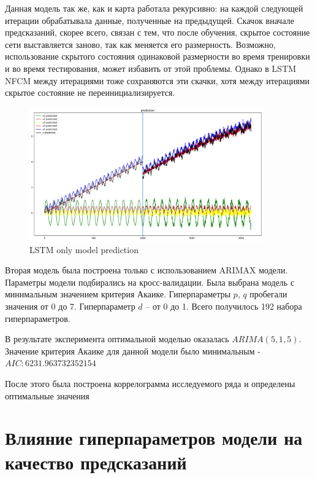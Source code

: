 Данная модель так же, как и карта работала рекурсивно:
на каждой следующей итерации обрабатывала данные, полученные на предыдущей.
Скачок вначале предсказаний, скорее всего, связан с тем, что после обучения,
скрытое состояние сети выставляется заново, так как меняется его размерность.
Возможно, использование скрытого состояния одинаковой размерности во время
тренировки и во время тестирования, может избавить от этой проблемы. Однако
в LSTM NFCM между итерациями тоже сохраняются эти скачки, хотя между итерациями
скрытое состояние не переинициализируется.

\begin{figure}[t]
	\centering
	\includegraphics[width=0.9\textwidth]{./img/lstm_only_prediction.png}
	\caption{LSTM only model prediction}
	\label{img:lstm_only_prediction}
\end{figure}


Вторая модель была построена только с использованием ARIMAX модели.
Параметры модели подбирались на кросс-валидации. Была выбрана модель с минимальным
значением критерия Акаике. Гиперпараметры $ p $, $ q $ пробегали значения от 0 до 7.
Гиперпараметр $ d $ -- от 0 до 1. Всего получилось 192 набора гиперпараметров.

В результате эксперимента оптимальной моделью оказалась $ ARIMA(5, 1, 5) $.
Значение критерия Акаике для данной модели было минимальным -~ $ AIC: 6231.963732352154 $





После этого была построена коррелограмма исследуемого ряда и определены оптимальные
значения 

\section{Влияние гиперпараметров модели на качество предсказаний}

